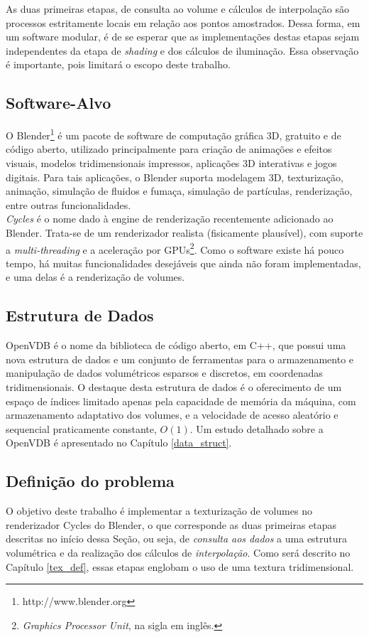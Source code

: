 As duas primeiras etapas, de consulta ao volume e cálculos de interpolação são processos estritamente locais em relação aos pontos amostrados. Dessa forma, em um software modular, é de se esperar que as implementações destas etapas sejam independentes da etapa de \emph{shading} e dos cálculos de iluminação. Essa observação é importante, pois limitará o escopo deste trabalho.

\subsection*{Software-Alvo}
O Blender\footnote{http://www.blender.org} é um pacote de software de computação gráfica 3D, gratuito e de código aberto, utilizado principalmente para criação de animações e efeitos visuais, modelos tridimensionais impressos, aplicações 3D interativas e jogos digitais. Para tais aplicações, o Blender suporta modelagem 3D, texturização, animação, simulação de fluidos e fumaça, simulação de partículas, renderização, entre outras funcionalidades. \\

\emph{Cycles} é o nome dado à engine de renderização recentemente adicionado ao Blender. Trata-se de um renderizador realista (fisicamente plausível), com suporte a \emph{multi-threading} e a aceleração por GPUs\footnote{\emph{Graphics Processor Unit}, na sigla em inglês.}. Como o software existe há pouco tempo, há muitas funcionalidades desejáveis que ainda não foram implementadas, e uma delas é a renderização de volumes.

\subsection*{Estrutura de Dados}
OpenVDB é o nome da biblioteca de código aberto, em C++, que possui uma nova estrutura de dados e um conjunto de ferramentas para o armazenamento e manipulação de dados volumétricos esparsos e discretos, em coordenadas tridimensionais. O destaque desta estrutura de dados é o oferecimento de um espaço de índices limitado apenas pela capacidade de memória da máquina, com armazenamento adaptativo dos volumes, e a velocidade de acesso aleatório e sequencial praticamente constante, $O(1)$. Um estudo detalhado sobre a OpenVDB é apresentado no Capítulo \ref{data_struct}.

\subsection*{Definição do problema}
\label{def_problem}
O objetivo deste trabalho é implementar a texturização de volumes no renderizador Cycles do Blender, o que corresponde as duas primeiras etapas descritas no início dessa Seção, ou seja, de \emph{consulta aos dados} a uma estrutura volumétrica e da realização dos cálculos de \emph{interpolação}. Como será descrito no Capítulo \ref{tex_def}, essas etapas englobam o uso de uma textura tridimensional.\\

